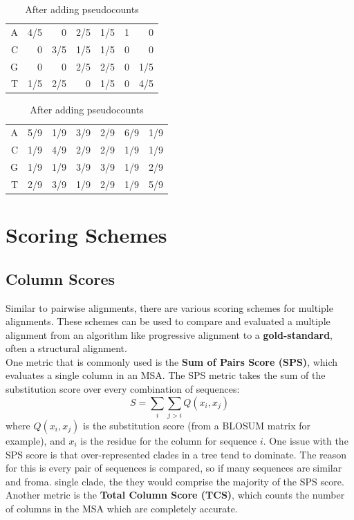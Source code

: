 \documentclass[12pt]{article}
\begin{document}
\begin{table}[h]
\parbox{.45\linewidth}{
\centering
\begin{tabular}{r|rrrrrr}
A & 4/5 & 0  & 2/5 & 1/5 & 1 & 0   \\ \cline{2-7} 
C & 0  & 3/5 & 1/5 & 1/5 & 0 & 0   \\ \cline{2-7} 
G & 0  & 0  & 2/5 & 2/5 & 0 & 1/5 \\ \cline{2-7} 
T & 1/5 & 2/5 & 0  & 1/5 & 0 & 4/5
\end{tabular}
\caption*{Before pseudocounts}
}
\parbox{.45\linewidth}{
\centering
\begin{tabular}{r|rrrrrr}
A & 5/9 & 1/9  & 3/9 & 2/9 & 6/9 & 1/9   \\ \cline{2-7} 
C & 1/9  & 4/9 & 2/9 & 2/9 & 1/9 & 1/9   \\ \cline{2-7} 
G & 1/9  & 1/9  & 3/9 & 3/9 & 1/9 & 2/9 \\ \cline{2-7} 
T & 2/9 & 3/9 & 1/9  & 2/9 & 1/9 & 5/9
\end{tabular}
\caption*{After adding pseudocounts}
}
\end{table}
\section{Scoring Schemes}
\subsection{Column Scores}
Similar to pairwise alignments, there are various scoring schemes for multiple alignments. These schemes can be used to compare and evaluated a multiple alignment from an algorithm like progressive alignment to a \textbf{gold-standard}, often a structural alignment.\\[10pt]
One metric that is commonly used is the \textbf{Sum of Pairs Score (SPS)}, which evaluates a single column in an MSA. The SPS metric takes the sum of the substitution score over every combination of sequences:
$$S = \sum_i\sum_{j>i}Q(x_i, x_j)$$
where $Q(x_i, x_j)$ is the substitution score (from a BLOSUM matrix for example), and $x_i$ is the residue for the column for sequence $i$. One issue with the SPS score is that over-represented clades in a tree tend to dominate. The reason for this is every pair of sequences is compared, so if many sequences are similar and froma. single clade, the they would comprise the majority of the SPS score. Another metric is the \textbf{Total Column Score (TCS)}, which counts the number of columns in the MSA which are completely accurate. 
\end{document}
